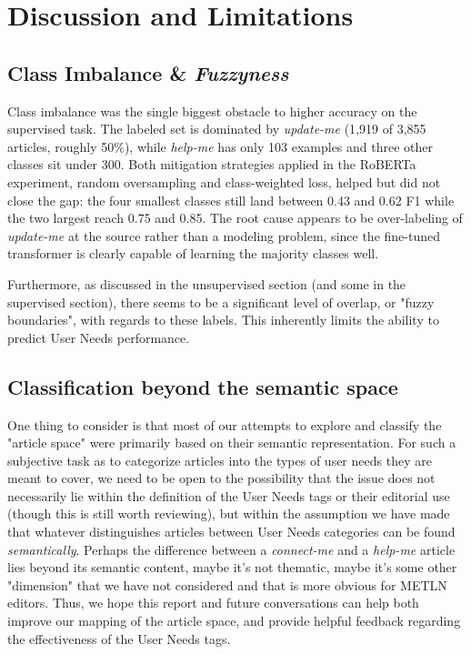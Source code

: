 \documentclass[11pt]{article}
\begin{document}
\section{Discussion and Limitations}
\subsection{Class Imbalance \& \textit{Fuzzyness}}
Class imbalance was the single biggest obstacle to higher accuracy on the supervised task. The labeled set is dominated by \textit{update-me} (1{,}919 of 3{,}855 articles, roughly 50\%), while \textit{help-me} has only 103 examples and three other classes sit under 300. Both mitigation strategies applied in the RoBERTa experiment, random oversampling and class-weighted loss, helped but did not close the gap: the four smallest classes still land between 0.43 and 0.62 F1 while the two largest reach 0.75 and 0.85. The root cause appears to be over-labeling of \textit{update-me} at the source rather than a modeling problem, since the fine-tuned transformer is clearly capable of learning the majority classes well.

Furthermore, as discussed in the unsupervised section (and some in the supervised section), there seems to be a significant level of overlap, or "fuzzy boundaries", with regards to these labels. This inherently limits the ability to predict User Needs performance.

\subsection{Classification beyond the semantic space}

One thing to consider is that most of our attempts to explore and classify the "article space" were primarily based on their semantic representation. For such a subjective task as to categorize articles into the types of user needs they are meant to cover, we need to be open to the possibility that the issue does not necessarily lie within the definition of the User Needs tags or their editorial use (though this is still worth reviewing), but within the assumption we have made that whatever distinguishes articles between User Needs categories can be found \textit{semantically}. Perhaps the difference between a \textit{connect-me} and a \textit{help-me} article lies beyond its semantic content, maybe it's not thematic, maybe it's some other "dimension" that we have not considered and that is more obvious for METLN editors. Thus, we hope this report and future conversations can help both improve our mapping of the article space, and provide helpful feedback regarding the effectiveness of the User Needs tags.
\end{document}
